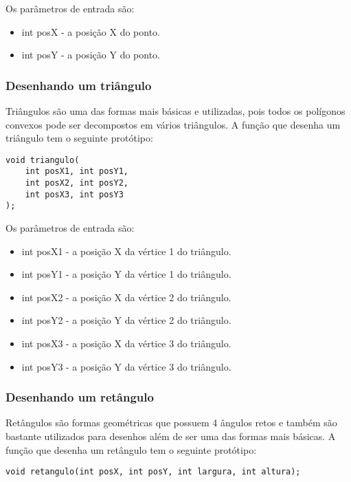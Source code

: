 \documentclass[12pt, %
openright,
oneside, %
a4paper,    %
brazil]{facom-ufu-abntex2}
\begin{document}
Os parâmetros de entrada são:

\begin{itemize}
    \item int posX - a posição X do ponto.
    \item int posY - a posição Y do ponto.
\end{itemize}

\subsubsection{Desenhando um triângulo}
Triângulos são uma das formas mais básicas e utilizadas, pois todos os polígonos convexos pode ser decompostos em vários triângulos. A função que desenha um triângulo tem o seguinte protótipo:

\begin{verbatim}
void triangulo(
    int posX1, int posY1,
    int posX2, int posY2,
    int posX3, int posY3
);
\end{verbatim}

Os parâmetros de entrada são:

\begin{itemize}
    \item int posX1 - a posição X da vértice 1 do triângulo.
    \item int posY1 - a posição Y da vértice 1 do triângulo.

    \item int posX2 - a posição X da vértice 2 do triângulo.
    \item int posY2 - a posição Y da vértice 2 do triângulo.

    \item int posX3 - a posição X da vértice 3 do triângulo.
    \item int posY3 - a posição Y da vértice 3 do triângulo.
\end{itemize}

\subsubsection{Desenhando um retângulo}
Retângulos são formas geométricas que possuem 4 ângulos retos e também são bastante utilizados para desenhos além de ser uma das formas mais básicas. A função que desenha um retângulo tem o seguinte protótipo:

\begin{verbatim}
void retangulo(int posX, int posY, int largura, int altura);
\end{verbatim}
\end{document}
